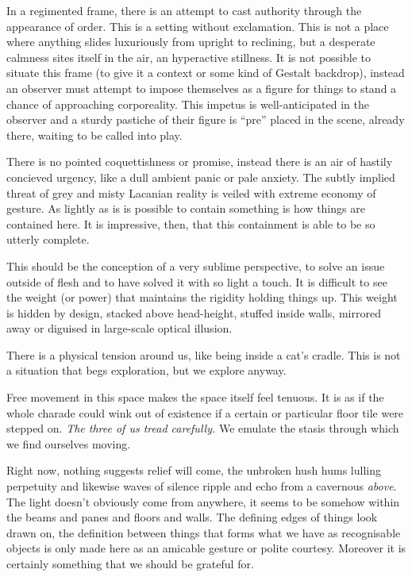 \documentclass{book}
\begin{document}
In a regimented frame, there is an attempt to cast authority through the
appearance of order. This is a setting without exclamation. This is not a place
where anything slides luxuriously from upright to reclining, but a desperate
calmness sites itself in the air, an hyperactive stillness. It is not possible
to situate this frame (to give it a context or some kind of Gestalt backdrop),
instead an observer must attempt to impose themselves as a figure for things to
stand a chance of approaching corporeality. This impetus is well-anticipated in
the observer and a sturdy pastiche of their figure is ``pre'' placed in the
scene, already there, waiting to be called into play.

There is no pointed coquettishness or promise, instead there is an air of
hastily concieved urgency, like a dull ambient panic or pale anxiety. The
subtly implied threat of grey and misty Lacanian reality is veiled with extreme
economy of gesture. As lightly as is is possible to contain something is how
things are contained here. It is impressive, then, that this containment is
able to be so utterly complete.

This should be the conception of a very sublime perspective, to solve an issue
outside of flesh and to have solved it with so light a touch. It is difficult
to see the weight (or power) that maintains the rigidity holding things up.
This weight is hidden by design, stacked above head-height, stuffed inside
walls, mirrored away or diguised in large-scale optical illusion.

There is a physical tension around us, like being inside a cat's cradle. This
is not a situation that begs exploration, but we explore anyway.

Free movement in this space makes the space itself feel tenuous. It is as if
the whole charade could wink out of existence if a certain or particular floor
tile were stepped on.  \emph{The three of us tread carefully.} We emulate the
stasis through which we find ourselves moving.

Right now, nothing suggests relief will come, the unbroken hush hums lulling
perpetuity and likewise waves of silence ripple and echo from a cavernous
\emph{above}.  The light doesn't obviously come from anywhere, it seems to be
somehow within the beams and panes and floors and walls. The defining edges of
things look drawn on, the definition between things that forms what we have as
recognisable objects is only made here as an amicable gesture or polite
courtesy. Moreover it is certainly something that we should be grateful for.
\end{document}
